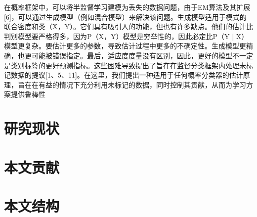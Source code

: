 在概率框架中，可以将半监督学习建模为丢失的数据问题，由于EM算法及其扩展[6]，可以通过生成模型（例如混合模型）来解决该问题。生成模型适用于模式的联合密度和类（X，Y）。它们具有吸引人的功能，但也有许多缺点。他们的估计比判别模型要严格得多，因为P（X，Y）模型是穷举性的，因此必定比P（Y | X）模型更复杂。要估计更多的参数，导致估计过程中更多的不确定性。生成模型更精确，也更可能被错误指定。最后，适应度度量没有区别，因此，更好的模型不一定是类别标签的更好预测指标。这些困难导致提出了旨在在监督分类框架内处理未标记数据的提议[1、5、11]。在这里，我们提出一种适用于任何概率分类器的估计原理，旨在在有益的情况下充分利用未标记的数据，同时控制其贡献，从而为学习方案提供鲁棒性

\section{研究现状}
\section{本文贡献}
\section{本文结构}
